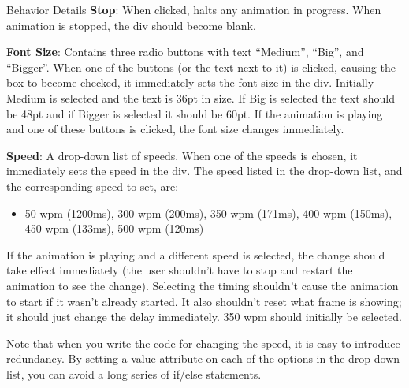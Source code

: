 \documentclass[programming]{../../mfcs}
\begin{document}
\begin{question}{Behavior Details}
\textbf{Stop}: When clicked, halts any animation in progress. When animation is stopped, the div should become blank.
\newline

\textbf{Font Size}: Contains three radio buttons with text ``Medium'', ``Big'', and ``Bigger''. When one of the buttons (or the text next to
it) is clicked, causing the box to become checked, it immediately sets the font size in the div.
Initially Medium is selected and the text is 36pt in size. If Big is selected the text should be 48pt and if Bigger is
selected it should be 60pt. If the animation is playing and one of these buttons is clicked, the font size changes
immediately.
\newline

\newpage
\textbf{Speed}: A drop-down list of speeds. When one of the speeds is chosen, it immediately sets the speed in the div. The speed
listed in the drop-down list, and the corresponding speed to set, are:
  \begin{itemize}
    \item 50 wpm (1200ms), 300 wpm (200ms), 350 wpm (171ms), 400 wpm (150ms), 450 wpm (133ms), 500 wpm (120ms)
  \end{itemize}

If the animation is playing and a different speed is selected, the change should take effect immediately (the user
shouldn't have to stop and restart the animation to see the change). Selecting the timing shouldn't cause the
animation to start if it wasn't already started. It also shouldn't reset what frame is showing; it should just change the
delay immediately. 350 wpm should initially be selected.
\newline

Note that when you write the code for changing the speed, it is easy to introduce redundancy. By setting a value
attribute on each of the options in the drop-down list, you can avoid a long series of if/else statements.
\newline


\end{question}
\end{document}
